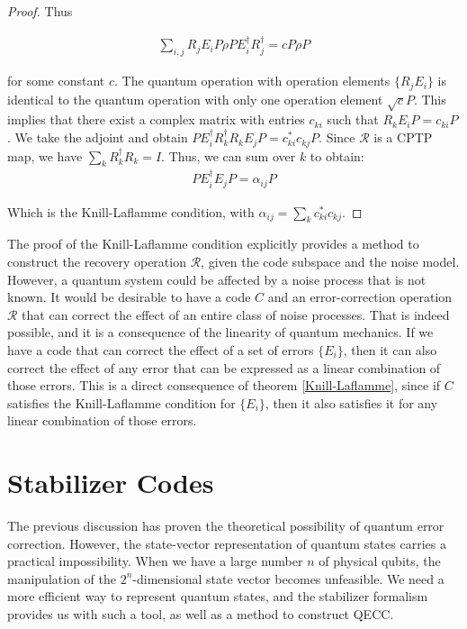 \documentclass[12pt, twoside, openany]{book}
\begin{document}
\begin{proof}
Thus

\begin{align*}
    \sum_{i,j} R_j E_i P \rho P E_i^\dagger R_j^\dagger = c P \rho P
\end{align*}

for some constant $c$. The quantum operation with operation elements $\{ R_j E_i \} $ is identical to the quantum operation with only one operation element $\sqrt{c} P$. This implies that there exist a complex matrix with entries $c_{ki}$ such that $R_k E_i P = c_{ki} P$. We take the adjoint and obtain $P E_i^\dagger R_k^\dagger R_k E_j P= c_{ki}^* c_{kj} P$. Since $\mathcal{R}$ is a CPTP map, we have $ \sum _k R_k^\dagger R_k = I$. Thus, we can sum over $k$ to obtain:
\begin{align*}
    P E_i^\dagger E_j P = \alpha_{ij} P
\end{align*}

Which is the Knill-Laflamme condition, with $\alpha_{ij} = \sum_k c_{ki}^* c_{kj}$.
    
\end{proof}

The proof of the Knill-Laflamme condition explicitly provides a method to construct the recovery operation $\mathcal{R}$, given the code subspace and the noise model. However, a quantum system could be affected by a noise process that is not known. It would be desirable to have a code $C$ and an error-correction operation $\mathcal{R}$ that can correct the effect of an entire class of noise processes. That is indeed possible, and it is a consequence of the linearity of quantum mechanics. If we have a code that can correct the effect of a set of errors $\{ E_i \}$, then it can also correct the effect of any error that can be expressed as a linear combination of those errors. This is a direct consequence of theorem \ref{Knill-Laflamme}, since if $C$ satisfies the Knill-Laflamme condition for $\{ E_i \}$, then it also satisfies it for any linear combination of those errors. \\

\section{Stabilizer Codes}

The previous discussion has proven the theoretical possibility of quantum error correction. However, the state-vector representation of quantum states carries a practical impossibility. When we have a large number $n$ of physical qubits, the manipulation of the $2^n$-dimensional state vector becomes unfeasible. We need a more efficient way to represent quantum states, and the stabilizer formalism provides us with such a tool, as well as a method to construct QECC. \\
\end{document}
